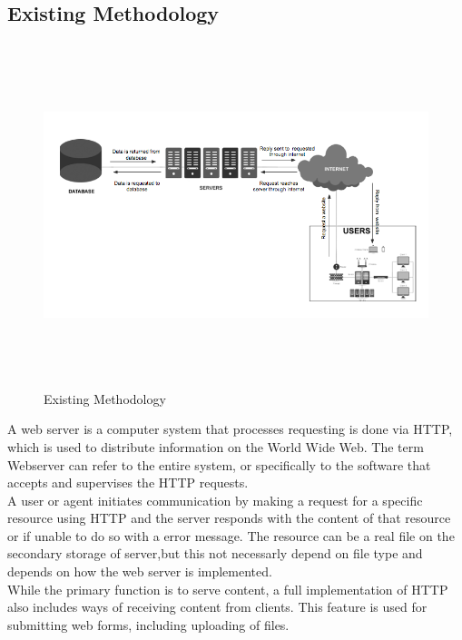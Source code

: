 \documentclass[12pt, a4paper]{article}
\begin{document}
\subsection{Existing Methodology}
\renewcommand\thefigure{\thesection.\arabic{figure}}
\begin{figure}[ht!]
    \centering
    \includegraphics[width=15cm,height=10cm,keepaspectratio]{existing.png}
      \caption{Existing Methodology}
    \label{fig:Existing Methodology}
    
\end{figure}
A web server is a computer system that processes requesting is done via HTTP, which is used to distribute information on the World Wide Web. The term Webserver can refer to the entire system, or specifically to the software that accepts and supervises the HTTP requests.
\\

\hspace{5mm}A user or agent initiates communication by making a request for a specific resource using HTTP and the server responds with the content of that resource or if unable to do so with a error message. The resource can be a real file on the secondary storage of server,but this not necessarly depend on file type and depends on how the web server is implemented.
\\

\hspace{5mm}While the primary function is to serve content, a full implementation of HTTP also includes ways of receiving content from clients. This feature is used for submitting web forms, including uploading of files.
\\
\end{document}
